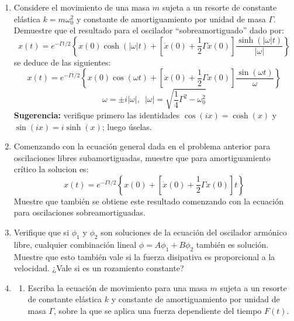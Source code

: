 \documentclass[11pt,spanish]{article}
\begin{document}
\begin{enumerate}
\begin{enumerate}
    \end{enumerate}



    \item Considere el movimiento de una masa $m$ sujeta a un resorte
    de constante elástica $k=m\omega_{0}^{2}$ y constante de
    amortiguamiento por unidad de masa $\Gamma$. Demuestre que el
    resultado para el oscilador ``sobreamortiguado'' dado por:
    \[
    x(t)=e^{-\Gamma t/2}\left\{ x(0)\cosh(\left|\omega\right|t) + \left[\dot{x}(0)+\frac{1}{2}\Gamma x(0)\right]\frac{\sinh(\left|\omega\right|t)}{\left|\omega\right|}\right\} 
    \]
    se deduce de las siguientes:
    \[
    x(t)=e^{-\Gamma t/2}\left\{ x(0)\cos(\omega t)+\left[\dot{x}(0)+\frac{1}{2}\Gamma x(0)\right]\frac{\sin(\omega t)}{\omega}\right\} 
    \]
    \[
    \omega=\pm i\left|\omega\right|,\,\,\,\left|\omega\right|=\sqrt{\frac{1}{4}\Gamma^{2}-\omega_{0}^{2}}
    \]
    \textbf{Sugerencia:} verifique primero las identidades $\cos(ix)=\cosh(x)$
    y $\sin(ix)=i\sinh(x)$; luego úselas.


    \item Comenzando con la ecuación general dada en el problema
    anterior para oscilaciones libres subamortiguadas, muestre que
    para amortiguamiento crítico la solucion es:
    \[
    x(t)=e^{-\Gamma t/2}\left\{ x(0)+\left[\dot{x}(0)+\frac{1}{2}\Gamma x(0)\right]t\right\} 
    \]
    Muestre que también se obtiene este resultado comenzando con la
    ecuación para oscilaciones sobreamortiguadas.


    \item Verifique que si $\phi_1$ y $\phi_2$ son soluciones de la ecuación del oscilador armónico libre, cualquier combinación lineal $\phi = A \phi_1 + B\phi_2$ también es solución. Muestre que esto también vale si la fuerza disipativa es proporcional a la velocidad. ¿Vale si es un rozamiento constante?


    \item 
    \begin{enumerate}
        \item Escriba la ecuación de movimiento para una masa $m$ sujeta a un
        resorte de constante elástica $k$ y constante de amortiguamiento por
        unidad de masa $\Gamma$, sobre la que se aplica una fuerza dependiente
        del tiempo $F(t)$. 


\end{enumerate}
\end{enumerate}
\end{document}

